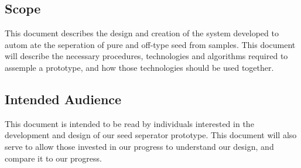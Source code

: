 \subsection {Scope}

This document describes the design and creation of the system developed to autom
ate the seperation of pure and off-type seed from samples. 
This document will describe the necessary procedures, technologies and algorithms required to assemple a prototype, 
and how those technologies should be used together.

\subsection {Intended Audience}

This document is intended to be read by individuals interested in the development and design of our seed
seperator prototype. This document will also serve to allow those invested in our progress to understand our design,
and compare it to our progress. 

